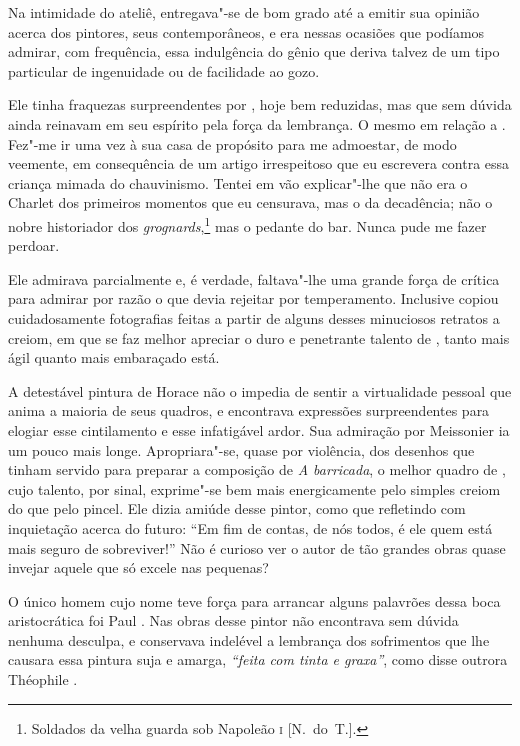 Na intimidade do ateliê, entregava"-se de bom grado até a emitir sua
opinião acerca dos pintores, seus contemporâneos, e era nessas ocasiões
que podíamos admirar, com frequência, essa indulgência do gênio que
deriva talvez de um tipo particular de ingenuidade ou de facilidade ao
gozo.

Ele tinha fraquezas surpreendentes por , hoje bem reduzidas, mas
que sem dúvida ainda reinavam em seu espírito pela força da lembrança. O
mesmo em relação a . Fez"-me ir uma vez à sua casa de propósito
para me admoestar, de modo veemente, em consequência de um artigo
irrespeitoso que eu escrevera contra essa criança mimada do
chauvinismo. Tentei em vão explicar"-lhe que não era o Charlet dos
primeiros momentos que eu censurava, mas o  da decadência; não o
nobre historiador dos \textit{grognards},\footnote{ Soldados da velha
guarda sob Napoleão  
\textsc{i} [N.~do~T.].} mas o pedante do bar. Nunca pude me
fazer perdoar.

Ele admirava  parcialmente e, é verdade, faltava"-lhe uma grande
força de crítica para admirar por razão o que devia rejeitar por
temperamento. Inclusive copiou cuidadosamente fotografias feitas a
partir de alguns desses minuciosos retratos a creiom, em que se faz
melhor apreciar o duro e penetrante talento de , tanto mais ágil
quanto mais embaraçado está.

A detestável pintura de Horace  não o impedia de sentir a
virtualidade pessoal que anima a maioria de seus quadros, e encontrava
expressões surpreendentes para elogiar esse cintilamento e esse
infatigável ardor. Sua admiração por Meissonier ia um pouco mais longe.
Apropriara"-se, quase por violência, dos desenhos que tinham servido
para preparar a composição de \textit{A barricada}, o melhor quadro de
, cujo talento, por sinal, exprime"-se bem mais energicamente
pelo simples creiom do que pelo pincel. Ele dizia amiúde desse pintor,
como que refletindo com inquietação acerca do futuro: ``Em
fim de contas, de nós todos, é ele quem está mais seguro de
sobreviver!'' Não é curioso ver o autor de tão grandes
obras quase invejar aquele que só excele nas pequenas?

O único homem cujo nome teve força para arrancar alguns palavrões dessa
boca aristocrática foi Paul . Nas obras desse pintor 
não encontrava sem dúvida nenhuma desculpa, e conservava indelével a
lembrança dos sofrimentos que lhe causara essa pintura suja e amarga,
\textit{``feita com tinta e graxa''}, como disse outrora Théophile .

